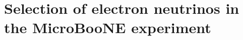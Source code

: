 \chapter{Selection of electron neutrinos in the MicroBooNE experiment}\label{ch:6-analysis}

\minitoc





